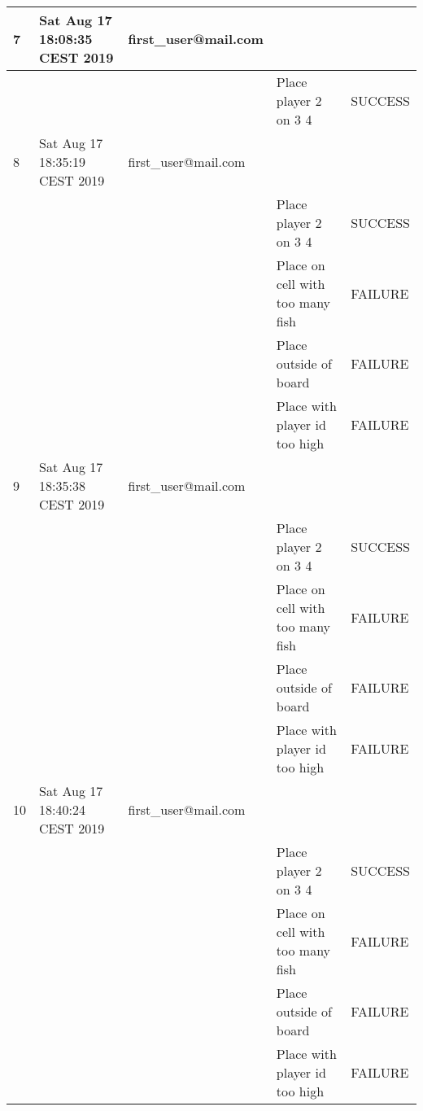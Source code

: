 \begin{center}
\begin{longtable}{|l|l|l|l|l|}
         7 &      Sat Aug 17 18:08:35 CEST 2019 & first\_user@mail.com &                                  &                 \\ \hline
         &      &                                 & Place player 2 on 3 4            & SUCCESS         \\ \hline
         8 &      Sat Aug 17 18:35:19 CEST 2019 & first\_user@mail.com &                                  &                 \\ \hline
         &      &                                 & Place player 2 on 3 4            & SUCCESS         \\ \hline
         &      &                                 & Place on cell with too many fish & FAILURE         \\ \hline
         &      &                                 & Place outside of board           & FAILURE         \\ \hline
         &      &                                 & Place with player id too high    & FAILURE         \\ \hline
         9 &      Sat Aug 17 18:35:38 CEST 2019 & first\_user@mail.com &                                  &                 \\ \hline
         &      &                                 & Place player 2 on 3 4            & SUCCESS         \\ \hline
         &      &                                 & Place on cell with too many fish & FAILURE         \\ \hline
         &      &                                 & Place outside of board           & FAILURE         \\ \hline
         &      &                                 & Place with player id too high    & FAILURE         \\ \hline
         10 &      Sat Aug 17 18:40:24 CEST 2019 & first\_user@mail.com &                                  &                 \\ \hline
         &      &                                 & Place player 2 on 3 4            & SUCCESS         \\ \hline
         &      &                                 & Place on cell with too many fish & FAILURE         \\ \hline
         &      &                                 & Place outside of board           & FAILURE         \\ \hline
         &      &                                 & Place with player id too high    & FAILURE         \\ \hline

\end{longtable}
\end{center}
